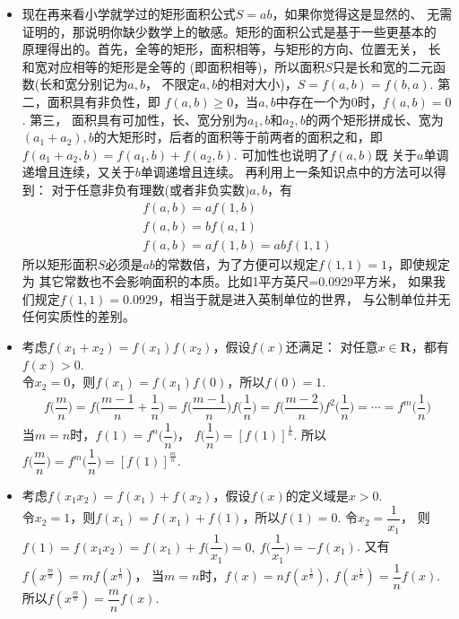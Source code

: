 \begin{itemize}[leftmargin=\inteval{\myitemleftmargin}pt,itemsep=
   \inteval{\myitemitempsep}pt,topsep=\inteval{\myitemtopsep}pt]
\item 现在再来看小学就学过的矩形面积公式$ S=ab $，如果你觉得这是显然的、
无需证明的，那说明你缺少数学上的敏感。矩形的面积公式是基于一些更基本的
原理得出的。首先，全等的矩形，面积相等，与矩形的方向、位置无关，
长和宽对应相等的矩形是全等的
(即面积相等)，所以面积$ S $只是长和宽的二元函数(长和宽分别记为$ a,b $，
不限定$ a,b $的相对大小)，$ S=f(a,b)=f(b,a) $. 第二，面积具有非负性，即
$ f(a,b)\geq 0 $，当$ a,b $中存在一个为0时，$ f(a,b)=0 $. 第三，
面积具有可加性，长、宽分别为$ a_1,b $和$ a_2,b $的两个矩形拼成长、宽为
$ (a_1+a_2),b $的大矩形时，后者的面积等于前两者的面积之和，即
$ f(a_1+a_2,b)=f(a_1,b)+f(a_2,b) $. 可加性也说明了$ f(a,b) $既
关于$ a $单调递增且连续，又关于$ b $单调递增且连续。
再利用上一条知识点中的方法可以得到：
对于任意非负有理数(或者非负实数)$ a,b $，有
\begin{gather*}
    f(a,b)=a f(1,b)  \\
    f(a,b)=b f(a,1)  \\
    f(a,b)=af(1,b)=abf(1,1)
\end{gather*}
所以矩形面积$ S $必须是$ ab $的常数倍，为了方便可以规定$ f(1,1)=1 $，即使规定为
其它常数也不会影响面积的本质。比如1平方英尺=0.0929平方米，
如果我们规定$ f(1,1)=0.0929 $，相当于就是进入英制单位的世界，
与公制单位并无任何实质性的差别。

\item 考虑$ f(x_1+x_2)=f(x_1)f(x_2) $，假设$ f(x) $还满足：
对任意$ x\in \textbf{R} $，都有$ f(x)> 0 $. \\ 
令$ x_2=0 $，则$ f(x_1)=f(x_1)f(0) $，所以$ f(0)=1 $. 
\begin{gather*}
    f\Big(\dfrac{m}{n}\Big)=f\Big(\dfrac{m-1}{n}+\dfrac{1}{n}\Big)=
    f\Big(\dfrac{m-1}{n}\Big)f\Big(\dfrac{1}{n}\Big)=
    f\Big(\dfrac{m-2}{n}\Big)f^2
    \Big(\dfrac{1}{n}\Big)=\cdots =f^m\Big(\dfrac{1}{n}\Big)
\end{gather*}
当$ m=n $时，$ f(1)=f^n\Big(\dfrac{1}{n}\Big) $，
$ f\Big(\dfrac{1}{n}\Big)=[f(1)]^{\frac{1}{n}} $. 
所以$f\Big(\dfrac{m}{n}\Big)=f^m\Big(\dfrac{1}{n}\Big)=
      [f(1)]^{\frac{m}{n}} $. 

\item 考虑$ f(x_1x_2)=f(x_1)+f(x_2) $，假设$ f(x) $的定义域是$ x> 0 $. \\
令$ x_2=1 $，则$ f(x_1)=f(x_1)+f(1) $，所以$ f(1)=0 $. 
令$ x_2=\dfrac{1}{x_1} $，
则$ f(1)=f(x_1x_2)=f(x_1)+f\Big(\dfrac{1}{x_1}\Big)=0 ,
\ f\Big(\dfrac{1}{x_1}\Big)=-f(x_1) $. 又有
$ f(x^{\frac{m}{n}})=mf(x^{\frac{1}{n}}) $，
当$ m=n $时，$ f(x)=nf(x^{\frac{1}{n}}),\ f(x^{\frac{1}{n}})=\dfrac{1}{n}f(x) $. 
所以$ f(x^{\frac{m}{n}})=\dfrac{m}{n}f(x) $. 


\end{itemize}
